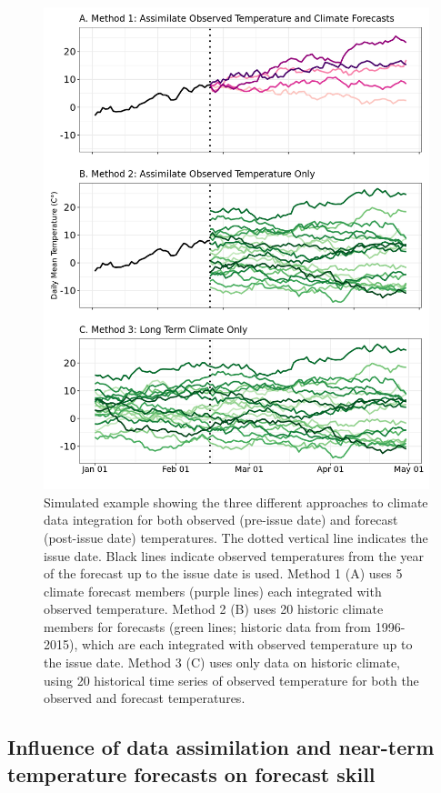 \documentclass[fleqn,10pt,lineno]{wlpeerj}
\begin{document}
\begin{figure}[ht]
\centering
\includegraphics[width=\linewidth]{figs/fig1_method_explainer.png}
\caption{Simulated example showing the three different approaches to climate data integration for both observed (pre-issue date) and forecast (post-issue date) temperatures. The dotted vertical line indicates the issue date. Black lines indicate observed temperatures from the year of the forecast up to the issue date is used. Method 1 (A) uses 5 climate forecast members (purple lines) each integrated with observed temperature. Method 2 (B) uses 20 historic climate members for forecasts (green lines; historic data from from 1996-2015), which are each integrated with observed temperature up to the issue date. Method 3 (C) uses only data on historic climate, using 20 historical time series of observed temperature for both the observed and forecast temperatures.}
\label{fig1}
\end{figure}


\subsection*{Influence of data assimilation and near-term temperature forecasts on forecast skill}
\end{document}
